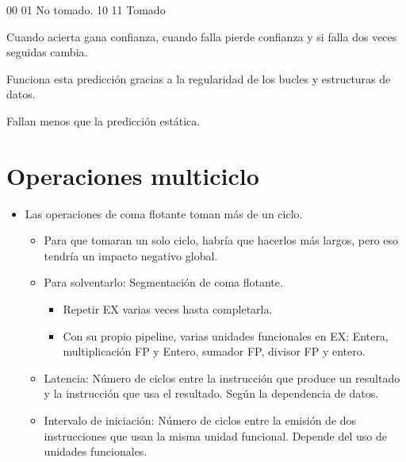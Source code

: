 \documentclass[12pt, twoside, openright]{report} %
\begin{document}
\begin{itemize}
\begin{itemize}
		            00 01 No tomado. 10 11 Tomado

		            Cuando acierta gana confianza, cuando falla pierde confianza y si falla dos veces seguidas cambia.

		            Funciona esta predicción gracias a la regularidad de los bucles y estructuras de datos.

		            Fallan menos que la predicción estática.

		            \begin{figure}[H]
			            {\def\svgwidth{.8\textwidth}
				            }
		            \end{figure}


	      \end{itemize}

\end{itemize}

\section{Operaciones multiciclo}

\begin{itemize}
	\item Las operaciones de coma flotante toman más de un ciclo.
	      \begin{itemize}
		      \item Para que tomaran un solo ciclo, habría que hacerlos más largos, pero eso tendría un impacto negativo global.
		      \item Para solventarlo: Segmentación de coma flotante.
		            \begin{itemize}
			            \item Repetir EX varias veces hasta completarla.
			            \item Con su propio pipeline, varias unidades funcionales en EX: Entera, multiplicación FP y Entero, sumador FP, divisor FP y entero.
			                  \begin{figure}[H]
				                  {\def\svgwidth{.8\textwidth}
					                  }
			                  \end{figure}

		            \end{itemize}

		      \item Latencia: Número de ciclos entre la instrucción que produce un resultado y la instrucción que usa el resultado. Según la dependencia de datos.

		      \item Intervalo de iniciación: Número de ciclos entre la emisión de dos instrucciones que usan la misma unidad funcional. Depende del uso de unidades funcionales.
	      \end{itemize}


\end{itemize}
\end{document}
